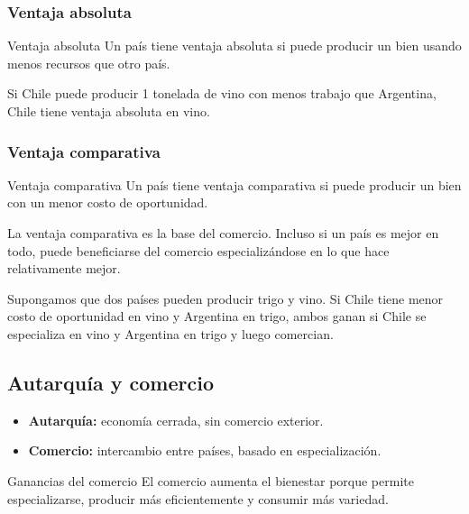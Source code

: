 \subsubsection{Ventaja absoluta}

\begin{concepto}{Ventaja absoluta}
Un país tiene ventaja absoluta si puede producir un bien usando menos recursos que otro país.
\end{concepto}

\begin{ejemplo}
Si Chile puede producir 1 tonelada de vino con menos trabajo que Argentina, Chile tiene ventaja absoluta en vino.
\end{ejemplo}

\subsubsection{Ventaja comparativa}

\begin{concepto}{Ventaja comparativa}
Un país tiene ventaja comparativa si puede producir un bien con un menor costo de oportunidad.
\end{concepto}

La ventaja comparativa es la base del comercio. Incluso si un país es mejor en todo, puede beneficiarse del comercio especializándose en lo que hace relativamente mejor.

\begin{ejemplo}
Supongamos que dos países pueden producir trigo y vino. Si Chile tiene menor costo de oportunidad en vino y Argentina en trigo, ambos ganan si Chile se especializa en vino y Argentina en trigo y luego comercian.
\end{ejemplo}

\subsection{Autarquía y comercio}

\begin{itemize}
    \item \textbf{Autarquía:} economía cerrada, sin comercio exterior.
    \item \textbf{Comercio:} intercambio entre países, basado en especialización.
\end{itemize}

\begin{concepto}{Ganancias del comercio}
El comercio aumenta el bienestar porque permite especializarse, producir más eficientemente y consumir más variedad.
\end{concepto}

